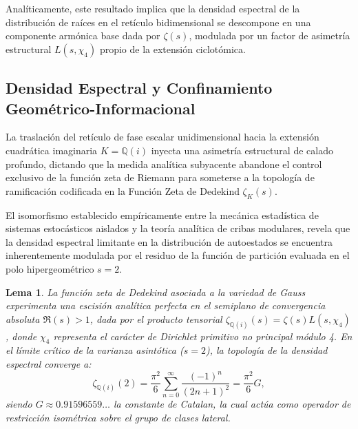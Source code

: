 \documentclass{article}
\numberwithin{equation}{section}
\theoremstyle{plain}
\newtheorem{lema}[teorema]{Lema}
\theoremstyle{definition}
\begin{document}
Analíticamente, este resultado implica que la densidad espectral de la distribución de raíces en el retículo bidimensional se descompone en una componente armónica base dada por $\zeta(s)$, modulada por un factor de asimetría estructural $L(s, \chi_4)$ propio de la extensión ciclotómica.

\subsection{Densidad Espectral y Confinamiento Geométrico-Informacional}

La traslación del retículo de fase escalar unidimensional hacia la extensión cuadrática imaginaria $K = \mathbb{Q}(i)$ inyecta una asimetría estructural de calado profundo, dictando que la medida analítica subyacente abandone el control exclusivo de la función zeta de Riemann para someterse a la topología de ramificación codificada en la Función Zeta de Dedekind $\zeta_K(s)$.

El isomorfismo establecido empíricamente entre la mecánica estadística de sistemas estocásticos aislados y la teoría analítica de cribas modulares, revela que la densidad espectral limitante en la distribución de autoestados se encuentra inherentemente modulada por el residuo de la función de partición evaluada en el polo hipergeométrico $s=2$.

\begin{lema}
La función zeta de Dedekind asociada a la variedad de Gauss experimenta una escisión analítica perfecta en el semiplano de convergencia absoluta $\Re(s) > 1$, dada por el producto tensorial $\zeta_{\mathbb{Q}(i)}(s) = \zeta(s) L(s, \chi_4)$, donde $\chi_4$ representa el carácter de Dirichlet primitivo no principal módulo 4. En el límite crítico de la varianza asintótica ($s=2$), la topología de la densidad espectral converge a:
\begin{equation}
    \zeta_{\mathbb{Q}(i)}(2) = \frac{\pi^2}{6} \sum_{n=0}^{\infty} \frac{(-1)^n}{(2n+1)^2} = \frac{\pi^2}{6} G,
\end{equation}
siendo $G \approx 0.91596559\dots$ la constante de Catalan, la cual actúa como operador de restricción isométrica sobre el grupo de clases lateral.
\end{lema}
\end{document}
